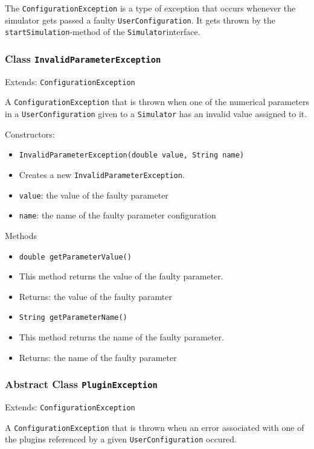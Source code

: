 \documentclass[parskip=full,11pt]{scrartcl}
\begin{document}
The \texttt{ConfigurationException} is a type of exception that occurs whenever the simulator gets passed a faulty \texttt{UserConfiguration}. It gets thrown by the \texttt{startSimulation}-method of the \texttt{Simulator}interface.

\subsubsection{Class \texttt{InvalidParameterException}}
Extends: \texttt{ConfigurationException}

A \texttt{ConfigurationException} that is thrown when one of the numerical parameters in a \texttt{UserConfiguration} given to a \texttt{Simulator} has an invalid value assigned to it.

Constructors:
\begin{itemize} \itemsep -10pt
	\item \texttt{InvalidParameterException(double value, String name)}
	\item[] Creates a new \texttt{InvalidParameterException}.
	\item[] \texttt{value}: the value of the faulty parameter
	\item[] \texttt{name}: the name of the faulty parameter configuration
\end{itemize}

Methods
\begin{itemize}\itemsep -10pt
	\item \texttt{double getParameterValue()}
	\item[] This method returns the value of the faulty parameter.
	\item[] Returns: the value of the faulty paramter
	\item \texttt{String getParameterName()}
	\item[] This method returns the name of the faulty parameter.
	\item[] Returns: the name of the faulty parameter
\end{itemize}

\subsubsection{Abstract Class \texttt{PluginException}}
Extends: \texttt{ConfigurationException}

A \texttt{ConfigurationException} that is thrown when an error associated with one of the plugins referenced by a given \texttt{UserConfiguration} occured.
\end{document}
